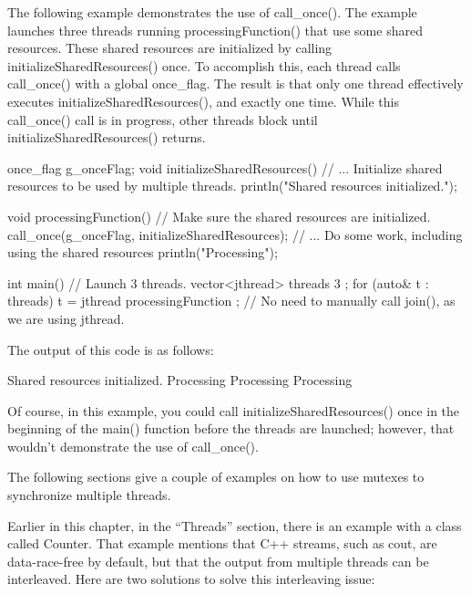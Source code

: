 
The following example demonstrates the use of call\_once(). The example launches three threads running processingFunction() that use some shared resources. These shared resources are initialized by calling initializeSharedResources() once. To accomplish this, each thread calls call\_once() with a global once\_flag. The result is that only one thread effectively executes initializeSharedResources(), and exactly one time. While this call\_once() call is in progress, other threads block until initializeSharedResources() returns.

\begin{cpp}
once_flag g_onceFlag;
void initializeSharedResources()
{
    // ... Initialize shared resources to be used by multiple threads.
    println("Shared resources initialized.");
}

void processingFunction()
{
    // Make sure the shared resources are initialized.
    call_once(g_onceFlag, initializeSharedResources);
    // ... Do some work, including using the shared resources
    println("Processing");
}

int main()
{
    // Launch 3 threads.
    vector<jthread> threads { 3 };
    for (auto& t : threads) {
        t = jthread { processingFunction };
    }
    // No need to manually call join(), as we are using jthread.
}
\end{cpp}

The output of this code is as follows:

\begin{shell}
Shared resources initialized.
Processing
Processing
Processing
\end{shell}

Of course, in this example, you could call initializeSharedResources() once in the beginning of the main() function before the threads are launched; however, that wouldn’t demonstrate the use of call\_once().


The following sections give a couple of examples on how to use mutexes to synchronize multiple threads.


Earlier in this chapter, in the “Threads” section, there is an example with a class called Counter. That example mentions that C++ streams, such as cout, are data-race-free by default, but that the output from multiple threads can be interleaved. Here are two solutions to solve this interleaving issue:

